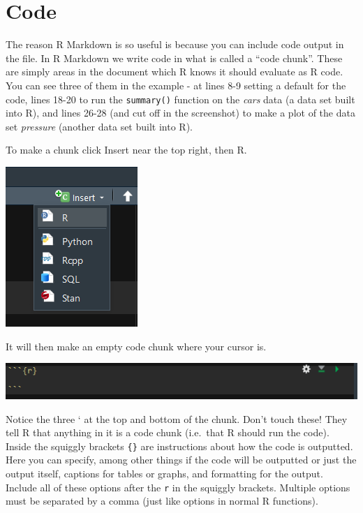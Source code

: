 \documentclass[
]{krantz}
\begin{document}
\hypertarget{code-1}{%
\section{Code}\label{code-1}}

The reason R Markdown is so useful is because you can include code output in the file. In R Markdown we write code in what is called a ``code chunk''. These are simply areas in the document which R knows it should evaluate as R code. You can see three of them in the example - at lines 8-9 setting a default for the code, lines 18-20 to run the \texttt{summary()} function on the \emph{cars} data (a data set built into R), and lines 26-28 (and cut off in the screenshot) to make a plot of the data set \emph{pressure} (another data set built into R).

To make a chunk click Insert near the top right, then R.

\includegraphics{images/markdown3.PNG}

It will then make an empty code chunk where your cursor is.

\includegraphics{images/chunk_example.PNG}

Notice the three ` at the top and bottom of the chunk. Don't touch these! They tell R that anything in it is a code chunk (i.e.~that R should run the code). Inside the squiggly brackets \texttt{\{\}} are instructions about how the code is outputted. Here you can specify, among other things if the code will be outputted or just the output itself, captions for tables or graphs, and formatting for the output. Include all of these options after the \texttt{r} in the squiggly brackets. Multiple options must be separated by a comma (just like options in normal R functions).
\end{document}
